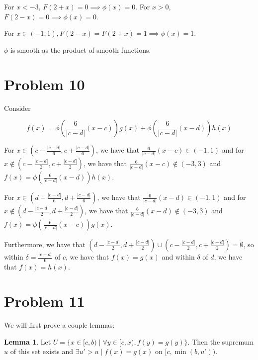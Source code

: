 \documentclass[12pt,letterpaper]{article}
\theoremstyle{definition}
\newtheorem*{lemma}{Lemma}
\begin{document}
For $x < -3$, $F(2+x) = 0 \implies \phi(x) = 0$. For $x > 0$, $F(2-x) = 0
\implies \phi(x) = 0$.

For $x \in (-1, 1), F(2-x) = F(2+x) = 1 \implies \phi(x) = 1$.

$\phi$ is smooth as the product of smooth functions.

\section*{Problem 10}

Consider

\[
  f(x) = \phi(\frac{6}{|c-d|}(x - c))g(x) + \phi(\frac{6}{|c-d|}(x - d))h(x)
\]

For $x \in (c - \frac{|c-d|}{6}, c + \frac{|c-d|}{6})$, we have that $\frac{6}{|c-d|}(x -
c) \in (-1, 1)$ and for $x \notin (c - \frac{|c-d|}{2}, c + \frac{|c-d|}{2})$,
we have that $\frac{6}{|c-d|}(x-c) \notin (-3, 3)$ and $f(x) = \phi(\frac{6}{|c-d|}(x - d))h(x)$. 

For $x \in (d - \frac{|c-d|}{6}, d + \frac{|c-d|}{6})$, we have that $\frac{6}{|c-d|}(x -
d) \in (-1, 1)$ and for $x \notin (d - \frac{|c-d|}{2}, d + \frac{|c-d|}{2})$,
we have that $\frac{6}{|c-d|}(x-d) \notin (-3, 3)$ and $f(x) = \phi(\frac{6}{|c-d|}(x - c))g(x)$. 

Furthermore, we have that $(d - \frac{|c-d|}{2}, d + \frac{|c-d|}{2}) \cup (c -
\frac{|c-d|}{2}, c + \frac{|c-d|}{2}) = \emptyset$, so within $\delta =
\frac{|c-d|}{6}$ of $c$, we have that $f(x) = g(x)$ and within $\delta$ of $d$,
we have that $f(x) = h(x)$.

\section*{Problem 11}

We will first prove a couple lemmas:

\begin{lemma}
  Let $U = \{x \in [c,b) \mid \forall y \in [c,x), f(y) = g(y)\}$. Then the supremum $u$ of this set
  exists and $\exists u' > u \mid f(x) = g(x)$ on $[c, \min(b,u'))$.
\end{lemma}
\end{document}
